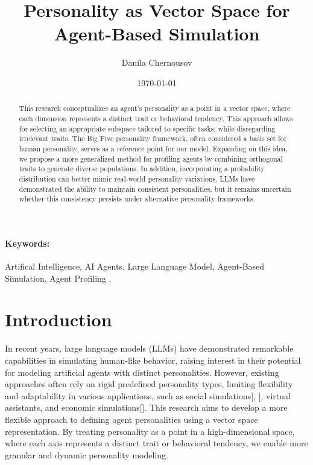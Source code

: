\documentclass[12pt]{article}
\title{Personality as Vector Space for Agent-Based Simulation}
\author{
  Danila Chernousov\\
}
\date{\today}
\begin{document}
\maketitle

\begin{abstract}
This research conceptualizes an agent's personality as a point in a vector space, where each dimension represents a distinct trait or behavioral tendency. This approach allows for selecting an appropriate subspace tailored to specific tasks, while disregarding irrelevant traits. The Big Five personality framework, often considered a basis set for human personality, serves as a reference point for our model. Expanding on this idea, we propose a more generalized method for profiling agents by combining orthogonal traits to generate diverse populations. In addition, incorporating a probability distribution can better mimic real-world personality variations. LLMs have demonstrated the ability to maintain consistent personalities, but it remains uncertain whether this consistency persists under alternative personality frameworks.

\end{abstract}

\paragraph{Keywords:} Artifical Intelligence, AI Agents, Large Language Model, Agent-Based Simulation, Agent Profiling .

\section{Introduction}
In recent years, large language models (LLMs) have demonstrated remarkable capabilities in simulating human-like behavior, raising interest in their potential for modeling artificial agents with distinct personalities. However, existing approaches often rely on rigid predefined personality types, limiting flexibility and adaptability in various applications, such as social simulations[\cite{park2024generativeagentsimulations1000}, \cite{park2023generativeagentsinteractivesimulacra}], virtual assistants, and economic simulations[\cite{Leng2024-qs}]. This research aims to develop a more flexible approach to defining agent personalities using a vector space representation. By treating personality as a point in a high-dimensional space, where each axis represents a distinct trait or behavioral tendency, we enable more granular and dynamic personality modeling.
\end{document}
